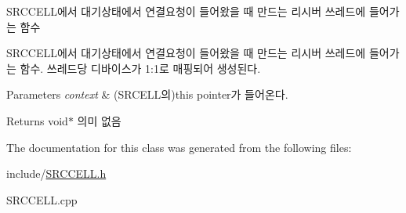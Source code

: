 S\+R\+C\+C\+E\+L\+L에서 대기상태에서 연결요청이 들어왔을 때 만드는 리시버 쓰레드에 들어가는 함수 

S\+R\+C\+C\+E\+L\+L에서 대기상태에서 연결요청이 들어왔을 때 만드는 리시버 쓰레드에 들어가는 함수. 쓰레드당 디바이스가 1\+:1로 매핑되어 생성된다. 
\begin{DoxyParams}{Parameters}
{\em context} & (S\+R\+C\+E\+L\+L의)this pointer가 들어온다. \\
\hline
\end{DoxyParams}
\begin{DoxyReturn}{Returns}
void$\ast$ 의미 없음 
\end{DoxyReturn}


The documentation for this class was generated from the following files\+:\begin{DoxyCompactItemize}
\item 
include/\hyperlink{SRCCELL_8h}{S\+R\+C\+C\+E\+L\+L.\+h}\item 
S\+R\+C\+C\+E\+L\+L.\+cpp\end{DoxyCompactItemize}

